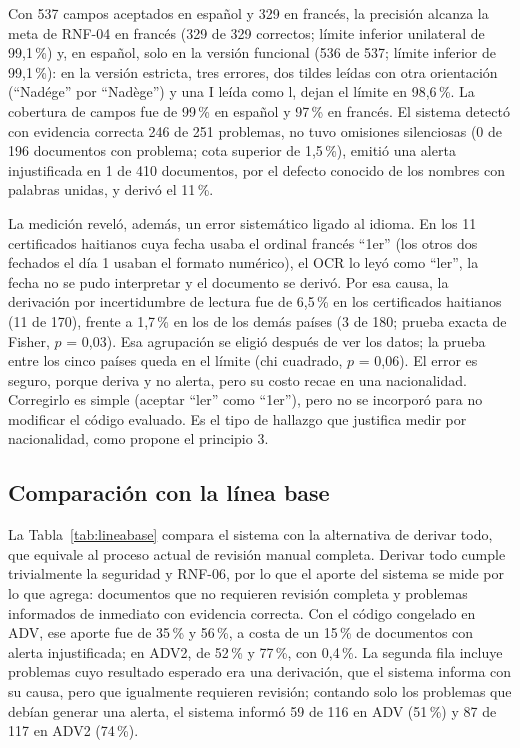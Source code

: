 \documentclass[11pt,a4paper]{article}
\begin{document}
Con 537 campos aceptados en español y 329 en francés, la precisión alcanza la meta de RNF-04 en francés (329 de 329 correctos; límite inferior unilateral de 99,1\,\%) y, en español, solo en la versión funcional (536 de 537; límite inferior de 99,1\,\%): en la versión estricta, tres errores, dos tildes leídas con otra orientación (``Nadége'' por ``Nadège'') y una I leída como l, dejan el límite en 98,6\,\%. La cobertura de campos fue de 99\,\% en español y 97\,\% en francés. El sistema detectó con evidencia correcta 246 de 251 problemas, no tuvo omisiones silenciosas (0 de 196 documentos con problema; cota superior de 1,5\,\%), emitió una alerta injustificada en 1 de 410 documentos, por el defecto conocido de los nombres con palabras unidas, y derivó el 11\,\%.

La medición reveló, además, un error sistemático ligado al idioma. En los 11 certificados haitianos cuya fecha usaba el ordinal francés ``1er'' (los otros dos fechados el día 1 usaban el formato numérico), el OCR lo leyó como ``ler'', la fecha no se pudo interpretar y el documento se derivó. Por esa causa, la derivación por incertidumbre de lectura fue de 6,5\,\% en los certificados haitianos (11 de 170), frente a 1,7\,\% en los de los demás países (3 de 180; prueba exacta de Fisher, $p$ = 0,03). Esa agrupación se eligió después de ver los datos; la prueba entre los cinco países queda en el límite (chi cuadrado, $p$ = 0,06). El error es seguro, porque deriva y no alerta, pero su costo recae en una nacionalidad. Corregirlo es simple (aceptar ``ler'' como ``1er''), pero no se incorporó para no modificar el código evaluado. Es el tipo de hallazgo que justifica medir por nacionalidad, como propone el principio 3.

\subsection{Comparación con la línea base}
\label{sec:lineabase}
La Tabla~\ref{tab:lineabase} compara el sistema con la alternativa de derivar todo, que equivale al proceso actual de revisión manual completa. Derivar todo cumple trivialmente la seguridad y RNF-06, por lo que el aporte del sistema se mide por lo que agrega: documentos que no requieren revisión completa y problemas informados de inmediato con evidencia correcta. Con el código congelado en ADV, ese aporte fue de 35\,\% y 56\,\%, a costa de un 15\,\% de documentos con alerta injustificada; en ADV2, de 52\,\% y 77\,\%, con 0,4\,\%. La segunda fila incluye problemas cuyo resultado esperado era una derivación, que el sistema informa con su causa, pero que igualmente requieren revisión; contando solo los problemas que debían generar una alerta, el sistema informó 59 de 116 en ADV (51\,\%) y 87 de 117 en ADV2 (74\,\%).
\end{document}
